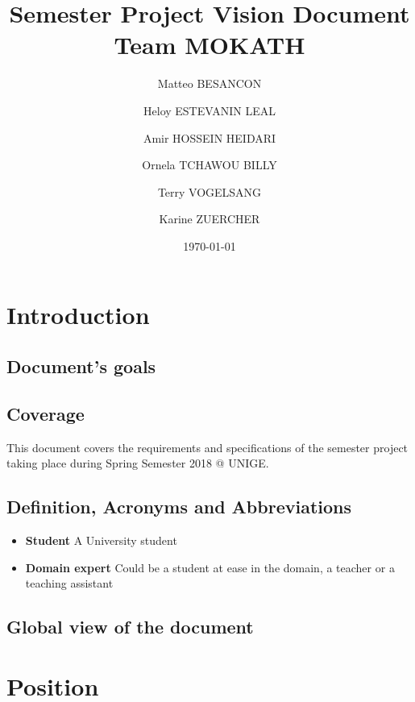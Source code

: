 \documentclass[12pt,a4paper,oneside, titlepage]{article}
\title {Semester Project Vision Document  \\ \large Team MOKATH}
\author{Matteo BESANCON}
\author{Heloy ESTEVANIN LEAL}
\author{Amir HOSSEIN HEIDARI}
\author{Ornela TCHAWOU BILLY}
\author{Terry VOGELSANG}
\author{Karine ZUERCHER}
\affil{Centre Universitaire D'Informatique, University Of Geneva}
\date{\today}
\begin{document}
	\renewcommand{\labelitemi}{$\bullet$}
	\maketitle
	\tableofcontents
	\newpage
	

	\section{Introduction}
	
		\subsection{Document's goals}
		\subsection{Coverage}
		    This document covers the requirements and specifications of the semester project
		    taking place during Spring Semester 2018 @ UNIGE.
		    
		\subsection{Definition, Acronyms and Abbreviations}
		
		\begin{itemize}
		
		    \item \textbf{Student} A University student
		    \item \textbf{Domain expert} Could be a student at ease in the domain, a teacher or a teaching 
		    assistant
		    
		\end{itemize}
	
		\subsection{Global view of the document}
		

	\section{Position}		
		
\end{document}
